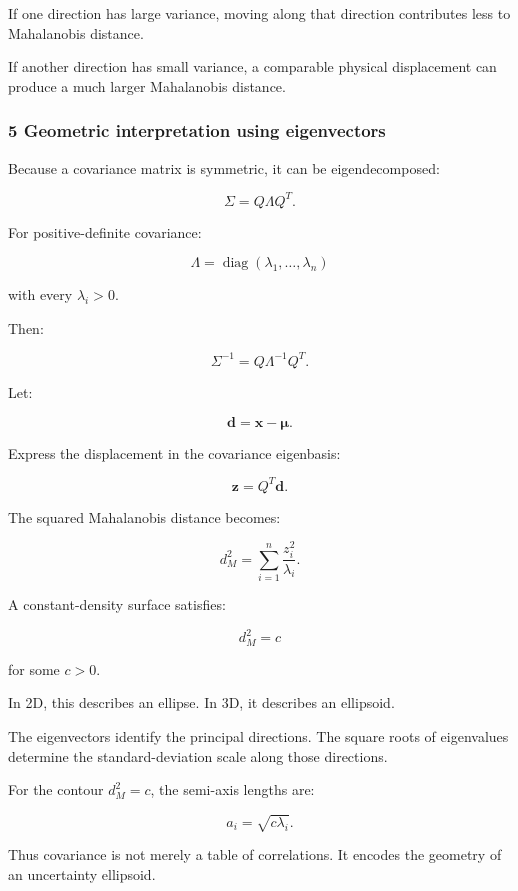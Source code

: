 If one direction has large variance, moving along that direction contributes less to Mahalanobis distance.

If another direction has small variance, a comparable physical displacement can produce a much larger Mahalanobis distance.

\subsubsection{5 Geometric interpretation using eigenvectors}\label{02-foundations-ii-ch024-geometric-interpretation-using-eigenvectors}

\hypertarget{02-foundations-ii-ch024-geometric-interpretation-using-eigenvectors}{}

Because a covariance matrix is symmetric, it can be eigendecomposed:

\[
 \Sigma=Q\Lambda Q^T.
\]

For positive-definite covariance:

\[
 \Lambda= \operatorname{diag}(\lambda_1,\ldots,\lambda_n)
\]

with every \(\lambda_i>0\).

Then:

\[
 \Sigma^{-1}=Q\Lambda^{-1}Q^T.
\]

Let:

\[
 \mathbf d=\mathbf x-\boldsymbol\mu.
\]

Express the displacement in the covariance eigenbasis:

\[
 \mathbf z=Q^T\mathbf d.
\]

The squared Mahalanobis distance becomes:

\[
 \boxed{ d_M^2= \sum_{i=1}^{n}\frac{z_i^2}{\lambda_i} }.
\]

A constant-density surface satisfies:

\[
 d_M^2=c
\]

for some \(c>0\).

In 2D, this describes an ellipse. In 3D, it describes an ellipsoid.

The eigenvectors identify the principal directions. The square roots of eigenvalues determine the standard-deviation scale along those directions.

For the contour \(d_M^2=c\), the semi-axis lengths are:

\[
 \boxed{ a_i=\sqrt{c\lambda_i} }.
\]

Thus covariance is not merely a table of correlations. It encodes the geometry of an uncertainty ellipsoid.

